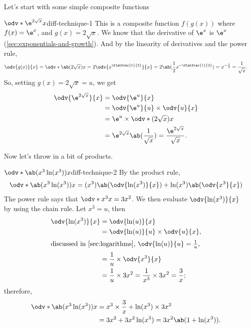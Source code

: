 Let's start with some simple composite functions
\begin{exmp}{$\odv*{\e^{2\sqrt{x}}}{x}$}{diff-technique-1}
	This is a composite function $f(g(x))$ where $f(x) = \e^x$, and $g(x) = 2\sqrt{x}$. We know that the derivative of $\e^x$ is $\e^x$ (\cref{sec:exponentials-and-growth}). And by the linearity of derivatives and the power rule,
	\begin{equation}
		\odv{g(x)}{x} = \odv*{\ab(2\sqrt{x})}{x} = 2\odv{x^{\flatfrac{1}{2}}}{x} = 2\ab(\frac{1}{2}x^{-\flatfrac{1}{2}}) = x^{-\frac{1}{2}} = \frac{1}{\sqrt{x}}.
	\end{equation}
	So, setting $g(x) = 2\sqrt{x} = u$, we get
	\begin{align}
		\odv{\e^{2\sqrt{x}}}{x} & = \odv{\e^u}{x}                                                             \\
		                        & = \odv{\e^u}{u}\times\odv{u}{x}                                             \\
		                        & = \e^u\times\odv*{(2\sqrt{x})}{x}                                           \\
		                        & = \e^{2\sqrt{x}}\ab(\frac{1}{\sqrt{x}}) = \frac{\e^{2\sqrt{x}}}{\sqrt{x}}.
	\end{align}
\end{exmp}
Now let's throw in a bit of products.
\begin{exmp}{$\odv*{\ab(x^3\ln(x^3))}{x}$}{diff-technique-2}
	By the product rule,
	\begin{equation}
		\odv*{\ab(x^3\ln(x^3))}{x} = (x^3)\ab(\odv{\ln(x^3)}{x}) + \ln(x^3)\ab(\odv{x^3}{x})
	\end{equation}
	The power rule says that $\odv*{x^3}{x} = 3x^2$. We then evaluate $\odv{\ln(x^3)}{x}$ by using the chain rule. Let $x^3 = u$, then
	\begin{align}
		\odv{\ln(x^3)}{x} & = \odv{\ln(u)}{x}                                                     \\
		                  & = \odv{\ln(u)}{u} \times \odv{u}{x},                                  \\
		\intertext{discussed in \cref{sec:logarithms}, $\odv{\ln(u)}{u} = \frac{1}{u}$,}
		                  & = \frac{1}{u} \times \odv{x^3}{x}                                     \\
		                  & = \frac{1}{u} \times 3x^2 = \frac{1}{x^3}\times 3x^2  = \frac{3}{x};
	\end{align}
	therefore,
	\begin{align}
		\odv*{\ab(x^3\ln(x^3))}{x} & = x^3\times\frac{3}{x} + \ln(x^3)\times 3x^2    \\
		                           & = 3x^2 + 3x^2\ln(x^3) = 3x^2\ab(1 + \ln(x^3)).
	\end{align}
\end{exmp}


